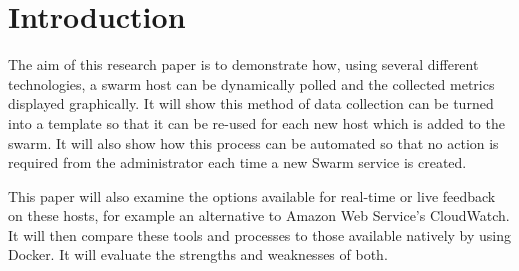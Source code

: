 \section{Introduction}
The aim of this research paper is to demonstrate how, using several different technologies, a swarm host can be dynamically polled and the collected metrics displayed graphically. It will show this method of data collection can be turned into a template so that it can be re-used for each new host which is added to the swarm. It will also show how this process can be automated so that no action is required from the administrator each time a new Swarm service is created.

This paper will also examine the options available for real-time or live feedback on these hosts, for example an alternative to Amazon Web Service's CloudWatch. It will then compare these tools and processes to those available natively by using Docker. It will evaluate the strengths and weaknesses of both.
